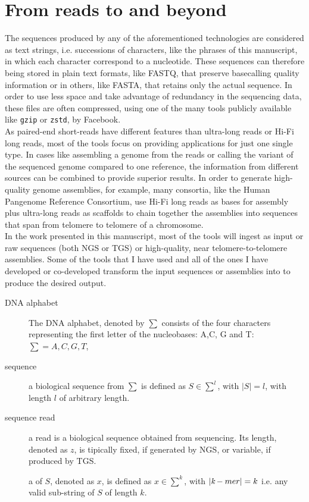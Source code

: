 \section{From reads to \kmers and beyond}
\label{sec:kmer}
The sequences produced by any of the aforementioned technologies are considered as text strings, i.e. successions of characters, like the phrases of this manuscript, in which each character correspond to a nucleotide. These sequences can therefore being stored in plain text formats, like FASTQ, that preserve basecalling quality information or in others, like FASTA, that retains only the actual sequence. In order to use less space and take advantage of redundancy in the sequencing data, these files are often compressed, using one of the many tools publicly available like \texttt{gzip} or \texttt{zstd}, by Facebook. \\
As paired-end short-reads have different features than ultra-long reads or Hi-Fi long reads, most of the tools focus on providing applications for just one single type. In cases like assembling a genome from the reads or calling the variant of the sequenced genome compared to one reference, the information from different sources can be combined to provide superior results. In order to generate high-quality genome assemblies, for example, many consortia, like the Human Pangenome Reference Consortium, use Hi-Fi long reads as bases for assembly plus ultra-long reads as scaffolds to chain together the assemblies into sequences that span from telomere to telomere of a chromosome.\\
In the work presented in this manuscript, most of the tools will ingest as input or raw sequences (both NGS or TGS) or high-quality, near telomere-to-telomere assemblies. Some of the tools that I have used and all of the ones I have developed or co-developed transform the input sequences or assemblies into \kmers to produce the desired output. \\
\begin{description}
	\item[DNA alphabet] The DNA alphabet, denoted by $\sum$ consists of the four characters representing the first letter of the nucleobases: A,C, G and T: $ \sum = {A, C, G, T}$, 
	\item[sequence] a biological sequence from $\sum$ is defined as $ S \in \sum^{l}$, with $\lvert S \rvert = l $, with length $l$ of arbitrary length.
	\item[sequence read] a read is a biological sequence obtained from sequencing. Its length, denoted as $z$, is tipically fixed, if generated by NGS, or variable, if produced by TGS.
	\item[\kmer] a \kmer of $S$, denoted as $x$, is defined as $ x \in \sum^{k}$, with $\lvert \emph{k}-mer \rvert = k $ i.e. any valid sub-string of $S$ of length $k$. 
\end{description}
